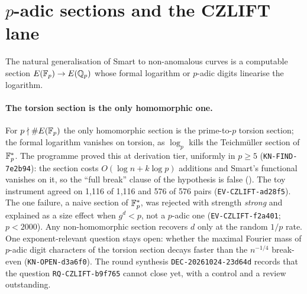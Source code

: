 \section{$p$-adic sections and the CZLIFT lane}\label{sec:tp-padic}

The natural generalisation of Smart to non-anomalous curves is a computable
section $E(\mathbb{F}_p)\to E(\mathbb{Q}_p)$ whose formal logarithm or $p$-adic
digits linearise the logarithm.

\paragraph{The torsion section is the only homomorphic one.} For
$p\nmid\#E(\mathbb{F}_p)$ the only homomorphic section is the prime-to-$p$
torsion section; the formal logarithm vanishes on torsion, as $\log_p$
kills the Teichm\"uller section of $\mathbb{F}_p^*$. The programme proved this at
derivation tier, uniformly in $p\ge5$ (\texttt{KN-FIND-7e2b94}): the section
costs $O(\log n+k\log p)$ additions and Smart's functional vanishes on it,
so the ``full break'' clause of the hypothesis is false
().
The toy instrument agreed on 1{,}116 of 1{,}116 and 576 of 576 pairs
(\texttt{EV-CZLIFT-ad28f5}). The one failure, a naive section of $\mathbb{F}_p^*$,
was rejected with strength \emph{strong} and explained as a size effect
when $g^d<p$, not a $p$-adic one (\texttt{EV-CZLIFT-f2a401}; $p<2000$). Any
non-homomorphic section recovers $d$ only at the random $1/p$ rate. One
exponent-relevant question stays open: whether the maximal Fourier mass of
$p$-adic digit characters of the torsion section decays faster than the
$n^{-1/4}$ break-even (\texttt{KN-OPEN-d3a6f0}). The round synthesis
\texttt{DEC-20261024-23d64d} records that the question
\texttt{RQ-CZLIFT-b9f765} cannot close yet, with a control and a review
outstanding.

